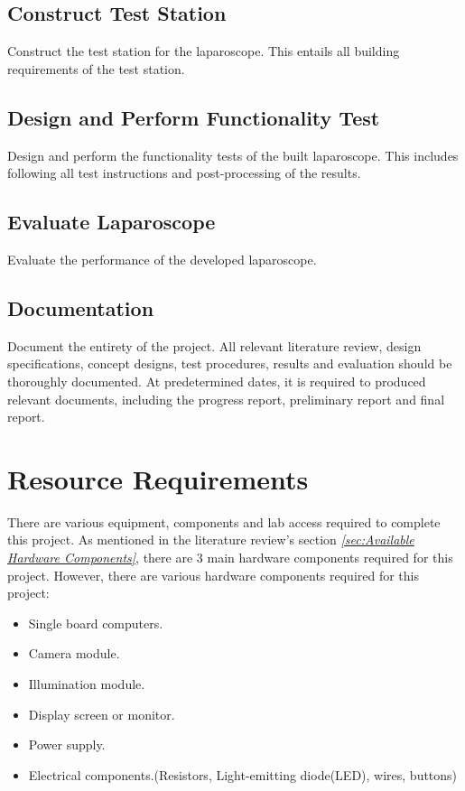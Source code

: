 \subsection{Construct Test Station}

Construct the test station for the laparoscope. This entails all building requirements of the test station.

\subsection{Design and Perform Functionality Test}

Design and perform the functionality tests of the built laparoscope. This includes following all test instructions and post-processing of the results.

\subsection{Evaluate Laparoscope}

Evaluate the performance of the developed laparoscope. 

\subsection{Documentation}

Document the entirety of the project. All relevant literature review, design specifications, concept designs, test procedures, results and evaluation should be thoroughly documented. At predetermined dates, it is required to produced relevant documents, including the progress report, preliminary report and final report. 

\section{Resource Requirements} 

There are various equipment, components and lab access required to complete this project. As mentioned in the literature review's section \textit{\ref{sec:Available Hardware Components}}, there are 3 main hardware components required for this project. However, there are various hardware components required for this project:

\begin{itemize}
    \item Single board computers.
    \item Camera module.
    \item Illumination module.
    \item Display screen or monitor.
    \item Power supply.
    \item Electrical components.(Resistors, Light-emitting diode(LED), wires, buttons)
\end{itemize}

